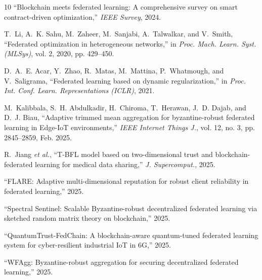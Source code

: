\documentclass{ieeeaccess}
\begin{document}
\begin{thebibliography}{10}
``Blockchain meets federated learning: A comprehensive survey on smart contract-driven optimization,''
\emph{IEEE Survey}, 2024.

T.~Li, A.~K. Sahu, M.~Zaheer, M.~Sanjabi, A.~Talwalkar, and V.~Smith,
``Federated optimization in heterogeneous networks,''
in \emph{Proc. Mach. Learn. Syst. (MLSys)}, vol. 2, 2020, pp. 429--450.

D.~A.~E. Acar, Y.~Zhao, R.~Matas, M.~Mattina, P.~Whatmough, and V.~Saligrama,
``Federated learning based on dynamic regularization,''
in \emph{Proc. Int. Conf. Learn. Representations (ICLR)}, 2021.

M.~Kalibbala, S.~H. Abdulkadir, H.~Chiroma, T.~Herawan, J.~D. Dajab, and D.~J. Biau,
``Adaptive trimmed mean aggregation for byzantine-robust federated learning in Edge-IoT environments,''
\emph{IEEE Internet Things J.}, vol. 12, no. 3, pp. 2845--2859, Feb. 2025.

R.~Jiang \emph{et al.},
``T-BFL model based on two-dimensional trust and blockchain-federated learning for medical data sharing,''
\emph{J. Supercomput.}, 2025.

``FLARE: Adaptive multi-dimensional reputation for robust client reliability in federated learning,'' 2025.

``Spectral Sentinel: Scalable Byzantine-robust decentralized federated learning via sketched random matrix theory on blockchain,'' 2025.

``QuantumTrust-FedChain: A blockchain-aware quantum-tuned federated learning system for cyber-resilient industrial IoT in 6G,'' 2025.

``WFAgg: Byzantine-robust aggregation for securing decentralized federated learning,'' 2025.

\end{thebibliography}

\vspace{11pt}
\end{document}
